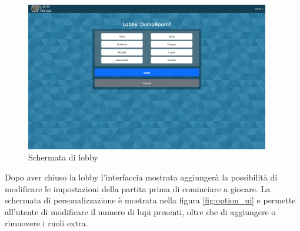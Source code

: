 \begin{figure}[H]
\begin{minipage}{0.25\textwidth}
    \end{minipage}\hfill
    \begin{minipage}{0.75\textwidth}
        \centering
        \includegraphics[width=0.95\textwidth]{img/screen/desktop/lobby_desktop.png}
    \end{minipage}
    \caption{Schermata di lobby}   
    \label{fig:lobby_ui}
\end{figure}

Dopo aver chiuso la lobby l'interfaccia mostrata aggiungerà la possibilità di modificare le impostazioni della partita prima di cominciare a giocare. La schermata di personalizzazione è mostrata nella figura \ref{fig:option_ui} e permette all'utente di modificare il numero di lupi presenti, oltre che di aggiungere o rimuovere i ruoli extra.



